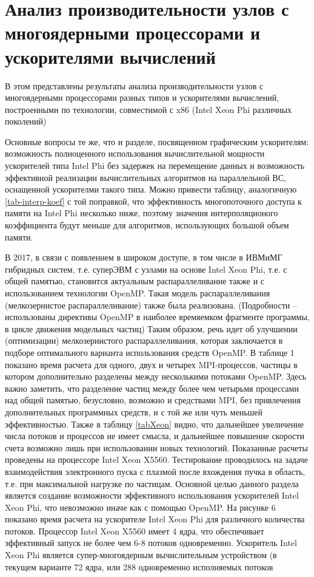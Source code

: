 \section{Анализ производительности узлов с многоядерными процессорами и ускорителями вычислений} 
В этом представлены результаты анализа производительности узлов с многоядерными процессорами разных типов и ускорителями вычислений, построенными по технологии, совместимой с x86 (Intel Xeon Phi различных поколений)

Основные вопросы те же, что и разделе, посвященном графическим ускорителям: возможность полноценного использования вычислительной мощности 
ускорителей типа Intel Phi без задержек на перемещение данных и возможность эффективной реализации вычислительных алгоритмов на параллельной ВС, оснащенной ускорителми такого типа. Можно привести таблицу, аналогичную \ref{tab-interp-koef} с той поправкой, что эффективность многопоточного доступа к памяти на Intel Phi несколько ниже, поэтому значения интерполяционого коэффициента будут меньше для алгоритмов, использующих большой объем памяти.

В 2017, в связи с появлением в широком доступе, в том числе в ИВМиМГ гибридных систем, т.е. суперЭВМ с узлами на основе Intel Xeon Phi, т.е. с общей памятью, становится актуальным распараллеливание также и с использованием технологии OpenMP. Такая модель распараллеливания (мелкозернистое распараллеливание) также была реализована. (Подробности – использованы директивы OpenMP в наиболее времяемком фрагменте программы, в цикле движения модельных частиц) Таким образом, речь идет об улучшении (оптимизации) мелкозернистого распараллеливания, которая заключается в подборе оптимального варианта использования средств OpenMP. 
В таблице 1 показано время расчета для одного, двух и четырех MPI-процессов, частицы в котором дополнительно разделены между несколькими потоками OpenMP. Здесь важно заметить, что разделение частиц между более чем четырьмя процессами над общей памятью, безусловно, возможно и средствами MPI, без привлечения дополнительных программных средств, и с той же или чуть меньшей эффективностью. Также в таблицу \ref{tabXeon} видно, что дальнейшее увеличение числа потоков и процессов не имеет смысла, и дальнейшее повышение скорости счета возможно лишь при использовании новых технологий. Показанные расчеты проведены на процессоре Intel Xeon X5560. Тестирование проводилось на задаче взаимодействия электронного пуска с плазмой после вхождения пучка в область, т.е. при максимальной нагрузке по частицам.
Основной целью данного раздела является создание возможности эффективного использования ускорителей Intel Xeon Phi, что невозможно иначе как с помощью OpenMP. На рисунке 6 показано время расчета на ускорителе Intel Xeon Phi  для различного количества потоков. Процессор Intel Xeon X5560 имеет 4 ядра, что обеспечивает эффективный запуск не более чем 6-8 потоков одновременно. Ускоритель Intel Xeon Phi является супер-многоядерным вычислительным устройством (в текущем варианте 72 ядра, или 288 одновременно исполняемых потоков

